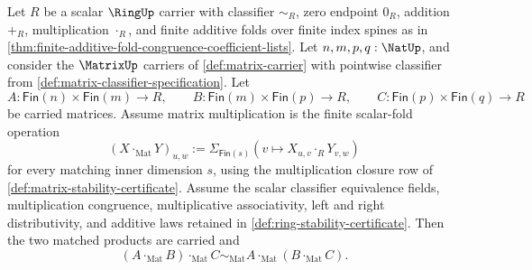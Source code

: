 \begin{theorem}
\label{thm:matrix-product-associativity-from-scalar-folds}
Let $R$ be a scalar $\RingUp$ carrier with classifier $\sim_R$, zero endpoint $0_R$, addition $+_R$, multiplication $\cdot_R$, and finite additive folds over finite index spines as in \autoref{thm:finite-additive-fold-congruence-coefficient-lists}. Let $n,m,p,q:\NatUp$, and consider the $\MatrixUp$ carriers of \autoref{def:matrix-carrier} with pointwise classifier from \autoref{def:matrix-classifier-specification}. Let
$$
A:\mathsf{Fin}(n)\times\mathsf{Fin}(m)\to R,
\qquad
B:\mathsf{Fin}(m)\times\mathsf{Fin}(p)\to R,
\qquad
C:\mathsf{Fin}(p)\times\mathsf{Fin}(q)\to R
$$
be carried matrices. Assume matrix multiplication is the finite scalar-fold operation
$$
(X\cdot_{\mathrm{Mat}}Y)_{u,w}:=
\Sigma_{\mathsf{Fin}(s)}(v\mapsto X_{u,v}\cdot_RY_{v,w})
$$
for every matching inner dimension $s$, using the multiplication closure row of \autoref{def:matrix-stability-certificate}. Assume the scalar classifier equivalence fields, multiplication congruence, multiplicative associativity, left and right distributivity, and additive laws retained in \autoref{def:ring-stability-certificate}. Then the two matched products are carried and
$$
(A\cdot_{\mathrm{Mat}}B)\cdot_{\mathrm{Mat}}C
\sim_{\mathrm{Mat}}
A\cdot_{\mathrm{Mat}}(B\cdot_{\mathrm{Mat}}C).
$$
\end{theorem}
